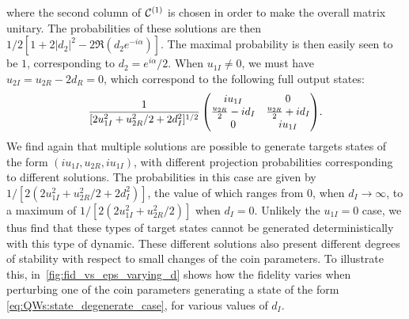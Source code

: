 where the second column of ${\mathcal{C}}^{(1)}$ is chosen in order to make the overall matrix unitary.
The probabilities of these solutions are then
$1/2[1 + 2\lvert d_2\rvert^2 - 2\Re(d_2e^{-i\alpha})]$.
The maximal probability is then easily seen to be $1$, corresponding to $d_2=e^{i\alpha}/2$.
When $u_{1I}\neq0$, we must have $u_{2I}=u_{2R}-2d_R=0$, which correspond to the following full output states:
\begin{equation}
	\scalemath{0.96}{
    \frac{1}{[2u_{1I}^2 + u_{2R}^2/2 + 2 d_I^2]^{1/2}}
	\begin{pmatrix}
		i u_{1I} & 0 \\
		\frac{u_{2R}}{2}-i d_I & \frac{u_{2R}}{2} + i d_I \\
		0 & i u_{1I}
	\end{pmatrix}}.
	\label{eq:QWs:state_degenerate_case}
\end{equation}
We find again that multiple solutions are possible to generate targets states of the form
$(iu_{1I},u_{2R},i u_{1I})$,
with different projection probabilities corresponding to different solutions.
The probabilities in this case are given by
$1/[2\left( 2 u_{1I}^2 + u_{2R}^2/2 + 2 d_I^2 \right)]$,
the value of which ranges from 0, when $d_I \to \infty$, to a maximum of
$1/[2(2u_{1I}^2 + u_{2R}^2 / 2)]$ when $d_I = 0$.
Unlikely the $u_{1I}=0$ case, we thus find that these types of target states cannot be generated deterministically with this type of dynamic.
These different solutions also present different degrees of stability with respect to small changes of the coin parameters.
To illustrate this, in~\cref{fig:fid_vs_eps_varying_d} shows how the fidelity varies when perturbing one of the coin parameters generating a state of the form \cref{eq:QWs:state_degenerate_case}, for various values of $d_I$.

